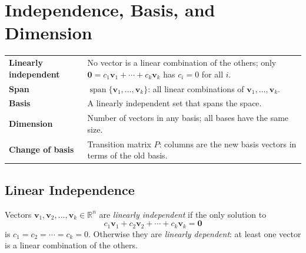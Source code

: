
\section{Independence, Basis, and Dimension}

\begin{tcolorbox}[colback=gray!6, colframe=gray!40, arc=2pt,
  left=6pt, right=6pt, top=4pt, bottom=4pt,
  title={\small\textbf{Basis and Dimension --- Quick Reference}},
  fonttitle=\small\bfseries]
\begin{tabular}{@{}p{}p{}@{}}
\textbf{Linearly independent} & No vector is a linear combination of the others; only $\mathbf{0} = c_1\mathbf{v}_1 + \cdots + c_k\mathbf{v}_k$ has $c_i = 0$ for all $i$. \\[4pt]
\textbf{Span}                 & $\operatorname{span}\{\mathbf{v}_1,\ldots,\mathbf{v}_k\}$: all linear combinations of $\mathbf{v}_1,\ldots,\mathbf{v}_k$. \\[4pt]
\textbf{Basis}                & A linearly independent set that spans the space. \\[4pt]
\textbf{Dimension}            & Number of vectors in any basis; all bases have the same size. \\[4pt]
\textbf{Change of basis}      & Transition matrix $P$: columns are the new basis vectors in terms of the old basis. \\
\end{tabular}
\end{tcolorbox}

\subsection{Linear Independence}

\begin{tcolorbox}[colback=propbox, colframe=propborder, arc=2pt,
  left=6pt, right=6pt, top=4pt, bottom=4pt,
  title={\small\textbf{Definition (Linear Independence)}},
  fonttitle=\small\bfseries]
Vectors $\mathbf{v}_1, \mathbf{v}_2, \ldots, \mathbf{v}_k \in \mathbb{R}^n$ are
\emph{linearly independent} if the only solution to
\[
  c_1\mathbf{v}_1 + c_2\mathbf{v}_2 + \cdots + c_k\mathbf{v}_k = \mathbf{0}
\]
is $c_1 = c_2 = \cdots = c_k = 0$.
Otherwise they are \emph{linearly dependent}: at least one vector is
a linear combination of the others.
\end{tcolorbox}

